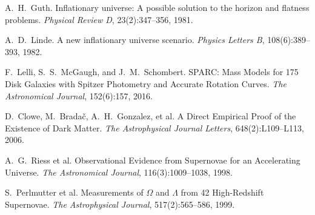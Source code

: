 \documentclass[11pt,a4paper]{article}
\numberwithin{equation}{section}
\theoremstyle{plain}
\theoremstyle{definition}
\theoremstyle{remark}
\begin{document}
\begin{thebibliography}{99}
A.~H.~Guth.
\newblock Inflationary universe: A possible solution to the horizon and flatness problems.
\newblock \emph{Physical Review D}, 23(2):347--356, 1981.

A.~D.~Linde.
\newblock A new inflationary universe scenario.
\newblock \emph{Physics Letters B}, 108(6):389--393, 1982.

F.~Lelli, S.~S.~McGaugh, and J.~M.~Schombert.
\newblock SPARC: Mass Models for 175 Disk Galaxies with Spitzer Photometry and Accurate Rotation Curves.
\newblock \emph{The Astronomical Journal}, 152(6):157, 2016.

D.~Clowe, M.~Bradač, A.~H.~Gonzalez, et al.
\newblock A Direct Empirical Proof of the Existence of Dark Matter.
\newblock \emph{The Astrophysical Journal Letters}, 648(2):L109--L113, 2006.

A.~G.~Riess et al.
\newblock Observational Evidence from Supernovae for an Accelerating Universe.
\newblock \emph{The Astronomical Journal}, 116(3):1009--1038, 1998.

S.~Perlmutter et al.
\newblock Measurements of $\Omega$ and $\Lambda$ from 42 High-Redshift Supernovae.
\newblock \emph{The Astrophysical Journal}, 517(2):565--586, 1999.

\end{thebibliography}

\end{document}
